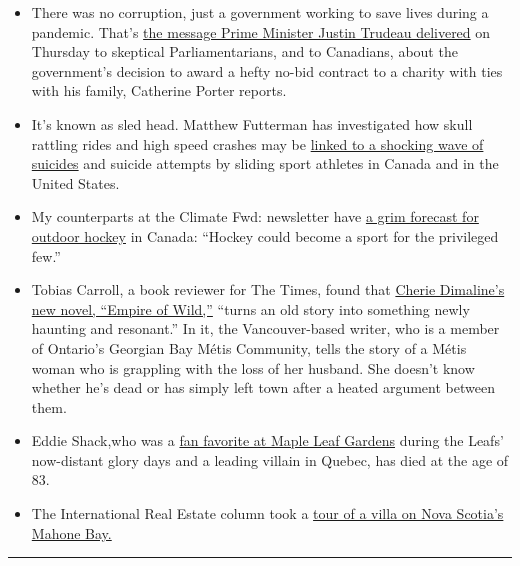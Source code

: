 \begin{itemize}
\item
  There was no corruption, just a government working to save lives
  during a pandemic. That's
  \href{https://www.nytimes3xbfgragh.onion/2020/07/30/world/canada/justin-trudeau-we-charity.html}{the
  message Prime Minister Justin Trudeau delivered} on Thursday to
  skeptical Parliamentarians, and to Canadians, about the government's
  decision to award a hefty no-bid contract to a charity with ties with
  his family, Catherine Porter reports.
\item
  It's known as sled head. Matthew Futterman has investigated how skull
  rattling rides and high speed crashes may be
  \href{https://www.nytimes3xbfgragh.onion/2020/07/26/sports/olympics/olympics-bobsled-suicide-brain-injuries.html}{linked
  to a shocking wave of suicides} and suicide attempts by sliding sport
  athletes in Canada and in the United States.
\item
  My counterparts at the Climate Fwd: newsletter have
  \href{https://www.nytimes3xbfgragh.onion/2020/07/29/climate/skating-hockey-climate-change.html}{a
  grim forecast for outdoor hockey} in Canada: ``Hockey could become a
  sport for the privileged few.''
\item
  Tobias Carroll, a book reviewer for The Times, found that
  \href{https://www.nytimes3xbfgragh.onion/2020/07/28/books/review/empire-of-wild-cherie-dimaline.html}{Cherie
  Dimaline's new novel, ``Empire of Wild,''} ``turns an old story into
  something newly haunting and resonant.'' In it, the Vancouver-based
  writer, who is a member of Ontario's Georgian Bay Métis Community,
  tells the story of a Métis woman who is grappling with the loss of her
  husband. She doesn't know whether he's dead or has simply left town
  after a heated argument between them.
\item
  Eddie Shack,who was a
  \href{https://www.nytimes3xbfgragh.onion/2020/07/27/sports/hockey/eddie-shack-feisty-wing-for-powerful-maple-leafs-dies-at-83.html}{fan
  favorite at Maple Leaf Gardens} during the Leafs' now-distant glory
  days and a leading villain in Quebec, has died at the age of 83.
\item
  The International Real Estate column took a
  \href{https://www.nytimes3xbfgragh.onion/2020/07/29/realestate/house-hunting-in-nova-scotia-a-sprawling-seaside-villa-for-2-million.html}{tour
  of a villa on Nova Scotia's Mahone Bay.}
\end{itemize}

\begin{center}\rule{0.5\linewidth}{\linethickness}\end{center}

